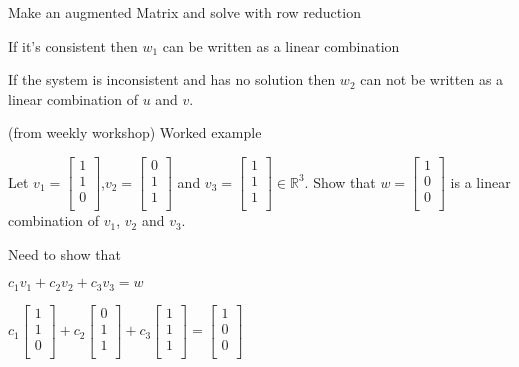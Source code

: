 \documentclass{extarticle}
\begin{document}
\begin{multicols}{4}
\begin{tcolorbox}[enhanced jigsaw,sharp corners,coltext=black,colback=BurntOrange!25!white,boxrule=0pt,breakable,size=minimal]
Make an augmented Matrix and solve with row reduction

If it's consistent then $w_1$ can be written as a linear combination

If the system is inconsistent and has no solution then $w_2$ can not be written as a linear combination of $u$ and $v$.

\end{tcolorbox}

(from weekly workshop)
Worked example

Let 
$v_1=\left[\begin{matrix}1\\1\\0\\\end{matrix}\right]$,$v_2=\left[\begin{matrix}0\\1\\1\\\end{matrix}\right]$ and $v_3=\left[\begin{matrix}1\\1\\1\\\end{matrix}\right]$$\in{\mathbb{R}}^3$.
Show that
$w=\left[\begin{matrix}1\\0\\0\\\end{matrix}\right]$
is a linear combination of $v_1$, $v_2$ and $v_3$.

Need to show that

$c_1v_1+c_2v_2+ c_3v_3=w$

$c_1\left[\begin{matrix}1\\1\\0\\\end{matrix}\right]+c_2\left[\begin{matrix}0\\1\\1\\\end{matrix}\right]+ c_3\left[\begin{matrix}1\\1\\1\\\end{matrix}\right]=\left[\begin{matrix}1\\0\\0\\\end{matrix}\right]$


\end{multicols}
\end{document}
